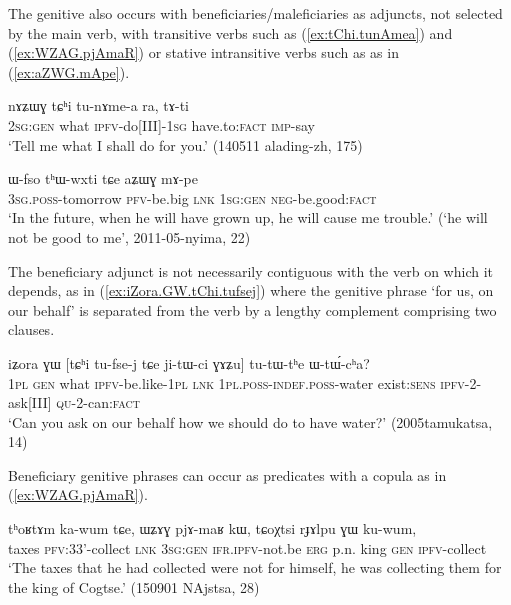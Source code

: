The genitive also occurs with beneficiaries/maleficiaries as adjuncts, not selected by the main verb, with transitive verbs such as  (\ref{ex:tChi.tunAmea}) and  (\ref{ex:WZAG.pjAmaR}) or stative intransitive verbs such as  as in (\ref{ex:aZWG.mApe}).

\begin{exe}
\ex \label{ex:tChi.tunAmea}
\gll nɤʑɯɣ tɕʰi tu-nɤme-a ra, tɤ-ti  \\
\textsc{2sg}:\textsc{gen} what \textsc{ipfv}-do[III]-\textsc{1sg} have.to:\textsc{fact} \textsc{imp}-say \\
\glt `Tell me what I shall do for you.' (140511 alading-zh, 175)
\end{exe}

\begin{exe}
\ex \label{ex:aZWG.mApe}
\gll  ɯ-fso tʰɯ-wxti tɕe aʑɯɣ mɤ-pe \\ 
\textsc{3sg}.\textsc{poss}-tomorrow \textsc{pfv}-be.big \textsc{lnk} \textsc{1sg}:\textsc{gen} \textsc{neg}-be.good:\textsc{fact} \\
\glt `In the future, when he will have grown up, he will cause me trouble.' (`he will not be good to me', 2011-05-nyima, 22)
\end{exe}

The beneficiary adjunct is not necessarily contiguous with the verb on which it depends, as in (\ref{ex:iZora.GW.tChi.tufsej}) where the genitive phrase  `for us, on our behalf'  is separated from the verb  by a lengthy complement comprising two clauses.

\begin{exe}
\ex \label{ex:iZora.GW.tChi.tufsej}
\gll  iʑora ɣɯ [tɕʰi tu-fse-j tɕe ji-tɯ-ci ɣɤʑu] tu-tɯ-tʰe ɯ-tɯ́-cʰa? \\
\textsc{1pl} \textsc{gen} what \textsc{ipfv}-be.like-\textsc{1pl} \textsc{lnk} \textsc{1pl}.\textsc{poss}-\textsc{indef}.\textsc{poss}-water exist:\textsc{sens} \textsc{ipfv}-2-ask[III] \textsc{qu}-2-can:\textsc{fact} \\
\glt `Can you ask on our behalf how we should do to have water?' (2005tamukatsa, 14)
\end{exe}

Beneficiary genitive phrases can occur as predicates with a copula as  in (\ref{ex:WZAG.pjAmaR}).

 \begin{exe}
\ex \label{ex:WZAG.pjAmaR}
\gll   tʰoʁtɤm ka-wum tɕe, ɯʑɤɣ pjɤ-maʁ kɯ, tɕoχtsi rɟɤlpu ɣɯ ku-wum,  \\
taxes \textsc{pfv}:3\fl{}3'-collect \textsc{lnk} \textsc{3sg}:\textsc{gen} \textsc{ifr}.\textsc{ipfv}-not.be \textsc{erg} p.n. king \textsc{gen} \textsc{ipfv}-collect \\
\glt `The taxes that he had collected were not for himself, he was collecting them for the king of Cogtse.' (150901 NAjstsa, 28)
\end{exe}

